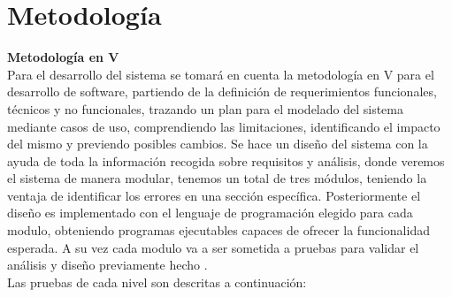 \section{Metodología}

\textbf{Metodología en V}\\
Para el desarrollo del sistema se tomará en cuenta la metodología en V para el desarrollo de software, partiendo de la definición de requerimientos funcionales, técnicos y no funcionales, trazando un plan para el modelado del sistema mediante casos de uso, comprendiendo las limitaciones, identificando el impacto del mismo y previendo posibles cambios. Se hace un diseño del sistema con la ayuda de toda la información recogida sobre requisitos y análisis, donde veremos el sistema de manera modular, tenemos un total de tres módulos, teniendo la ventaja de identificar los errores en una sección específica. Posteriormente el diseño es implementado con el lenguaje de programación elegido para cada modulo, obteniendo programas ejecutables capaces de ofrecer la funcionalidad esperada. A su vez cada modulo va a ser sometida a pruebas para validar el análisis y diseño previamente hecho \citep{Metodologia1}.
\\
Las pruebas de cada nivel son descritas a continuación:


